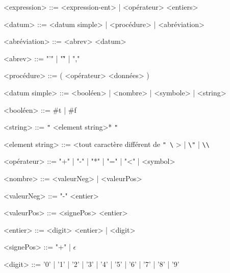 
\begin{grammarC}{<expression> ::= <expression-ent> | <opérateur> <entiers>}
  
  <datum> ::= <datum simple> | <procédure> | <abréviation>
  
  <abréviation> ::= <abrev> <datum>
  
  <abrev> ::= "'" | \space "\`" | ","
  
  <procédure> ::= ( <opérateur> <données> )
  
  <datum simple> ::= <booléen> | <nombre> | <symbole> | <string>
  
  <booléen> ::= \#t | \#f
  
  <string> ::= \verb|"| <element string>* \verb|"|
  
  <element string> ::= <tout caractère différent de \verb|" \|  > | \verb|\"| | \verb|\\|
  
  <opérateur> ::= "+" | "-" | "*" | "=" | "<" | <symbol>
  
  <nombre> ::= <valeurNeg> | <valeurPos>
  
  <valeurNeg> ::= "-" <entier>
  
  <valeurPos> ::= <signePos> <entier>
  
  <entier> ::= <digit> <entier> | <digit>
  
  <signePos> ::= "+" | $\epsilon$ 
  
  <digit> ::= '0' | '1' | '2' | '3' | '4' | '5' | '6' | '7' | '8' | '9'		
  
\end{grammarC}
